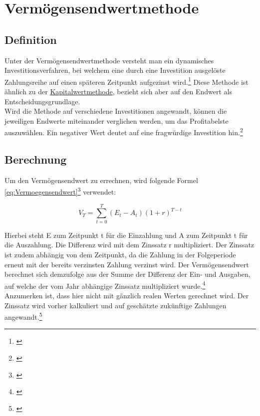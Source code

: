 \chapter{Vermögensendwertmethode}
\label{Vermoegensendwertmethode}

\section{Definition}

Unter der Vermögensendwertmethode versteht man ein dynamisches Investitionsverfahren, bei welchem eine durch eine Investition ausgelöste Zahlungsreihe auf einen späteren Zeitpunkt aufgezinst wird.\footnote{\cite{finanzen-vermoegensendwertmethode}} Diese Methode ist ähnlich zu der \hyperref[Kapitalwertmethode]{Kapitalwertmethode}, bezieht sich aber auf den Endwert als Entscheidungsgrundlage.\\
Wird die Methode auf verschiedene Investitionen angewandt, können die jeweiligen Endwerte miteinander verglichen werden, um das Profitabelste auszuwählen. Ein negativer Wert deutet auf eine fragwürdige Investition hin.\footnote{\cite{bwllernen-endwertmethode}}

\section{Berechnung}

Um den Vermögensendwert zu errechnen, wird folgende Formel \eqref{eq:Vermoegensendwert}\footnote{\cite{studyflix-endwertmethode}} verwendet:

\begin{equation}
    V_T = \sum_{ t = 0 }^{ T }{(E_{ t } - A_{ t })(1 + r)^{T - t}}
    \label{eq:Vermoegensendwert}
\end{equation}

\bigskip

\noindent
Hierbei steht E zum Zeitpunkt t für die Einzahlung und A zum Zeitpunkt t für die Auszahlung. Die Differenz wird mit dem Zinssatz r multipliziert. Der Zinssatz ist zudem abhängig von dem Zeitpunkt, da die Zahlung in der Folgeperiode erneut mit der bereits verzinsten Zahlung verzinst wird. Der Vermögensendwert berechnet sich demzufolge aus der Summe der Differenz der Ein- und Ausgaben, auf welche der vom Jahr abhängige Zinssatz multipliziert wurde.\footnote{\cite{studyflix-endwertmethode}}\\

\noindent
Anzumerken ist, dass hier nicht mit gänzlich realen Werten gerechnet wird. Der Zinssatz wird vorher kalkuliert und auf geschätzte zukünftige Zahlungen angewandt.\footnote{\cite{finanzen-vermoegensendwertmethode}}

